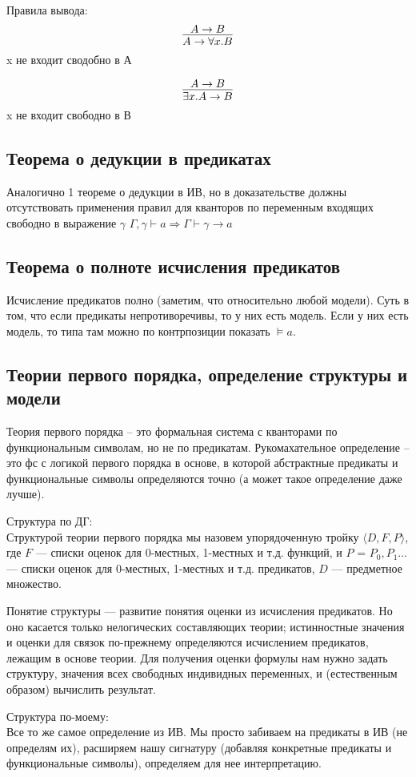 Правила вывода:
\[\infer{A \to \forall x . B}{A \to B}\]
 x не входит сводобно в А

\[\infer{\exists x . A \to B}{A \to B}\]
 x не входит свободно в В
\subsection{Теорема о дедукции в предикатах}
\label{sec-2-16}
Аналогично 1 теореме о дедукции в ИВ, но в доказательстве должны
отсутствовать применения правил для кванторов по переменным входящих
свободно в выражение $\gamma$
$\Gamma, \gamma \vdash a \Rightarrow \Gamma \vdash \gamma \to a$
\subsection{Теорема о полноте исчисления предикатов}
\label{sec-2-17}
Исчисление предикатов полно (заметим, что относительно любой модели).
Суть в том, что если предикаты непротиворечивы, то у них есть модель.
Если у них есть модель, то типа там можно по контрпозиции показать $\models a$.
\subsection{Теории первого порядка, определение структуры и модели}
\label{sec-2-18}
Теория первого порядка -- это формальная система с кванторами по
функциональным символам, но не по предикатам. Рукомахательное
определение – это фс с логикой первого порядка в основе, в которой
абстрактные предикаты и функциональные символы определяются точно
(а может такое определение даже лучше).

Структура по ДГ:\\
Структурой теории первого порядка мы назовем упорядоченную тройку
$\langle D, F, P\rangle$, где $F$ — списки оценок для 0-местных, 1-местных и т.д.
функций, и $P$ = $P_{0}, P_{1} \ldots$ — списки оценок для 0-местных,
1-местных и т.д. предикатов, $D$ — предметное множество.

Понятие структуры — развитие понятия оценки из исчисления предикатов.
Но оно касается только нелогических составляющих теории; истинностные
значения и оценки для связок по-прежнему определяются исчислением
предикатов, лежащим в основе теории. Для получения оценки формулы
нам нужно задать структуру, значения всех свободных индивидных
переменных, и (естественным образом) вычислить результат.

Структура по-моему:\\
Все то же самое определение из ИВ. Мы просто забиваем на предикаты
в ИВ (не определям их), расширяем нашу сигнатуру (добавляя конкретные
предикаты и функциональные символы), определяем для нее интерпретацию.

